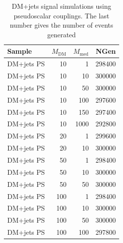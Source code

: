 \begin{table}[]
\centering
\begin{tabular}{lrrr}
\hline \hline
Sample & $M_{\text{DM}}$ & $M_{\text{med}}$ & NGen \\
\hline  
DM+jets PS &  10 &    1 & 298400 \\
DM+jets PS &  10 &   10 & 300000 \\
DM+jets PS &  10 &   50 & 300000 \\
DM+jets PS &  10 &  100 & 297600 \\
DM+jets PS &  10 &  150 & 297400 \\
DM+jets PS &  10 & 1000 & 292800 \\
DM+jets PS &  20 &    1 & 299600 \\
DM+jets PS &  20 &   10 & 300000 \\
DM+jets PS &  50 &    1 & 298400 \\
DM+jets PS &  50 &   10 & 300000 \\
DM+jets PS &  50 &   50 & 300000 \\
DM+jets PS & 100 &    1 & 298400 \\
DM+jets PS & 100 &   10 & 300000 \\
DM+jets PS & 100 &   50 & 300000 \\
DM+jets PS & 100 &  100 & 297800 \\
\hline \hline
\end{tabular}
\caption{DM+jets signal simulations using pseudoscalar couplings. The last number gives the number of events generated}
\label{tab:dmj_ps}
\end{table}

